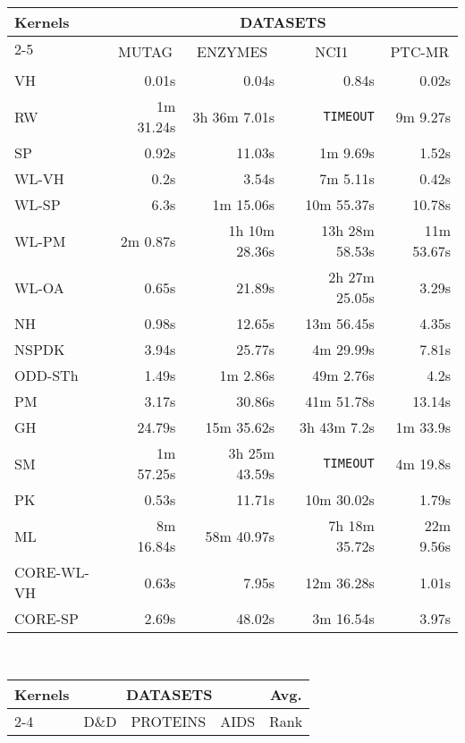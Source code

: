 \documentclass[twoside,11pt]{article}
\begin{document}
\begin{table}[t]
\centering
\scriptsize
\def\arraystretch{1.05}
\begin{tabular}{lrrrr} \toprule
\multirow{3}{*}{Kernels} & \multicolumn{4}{c}{DATASETS} \\ \cline{2-5}
& \multicolumn{1}{c}{\multirow{2}{*}{MUTAG}} & \multicolumn{1}{c}{\multirow{2}{*}{ENZYMES}} & \multicolumn{1}{c}{\multirow{2}{*}{NCI1}} & \multicolumn{1}{c}{\multirow{2}{*}{PTC-MR}} \\
& & & & \\
\midrule
VH & 0.01s & 0.04s & 0.84s & 0.02s \\ 
RW & 1m 31.24s & 3h 36m 7.01s & \texttt{TIMEOUT} & 9m 9.27s \\ 
SP & 0.92s & 11.03s & 1m 9.69s & 1.52s \\ 
WL-VH & 0.2s & 3.54s & 7m 5.11s & 0.42s \\ 
WL-SP & 6.3s & 1m 15.06s & 10m 55.37s & 10.78s \\ 
WL-PM & 2m 0.87s & 1h 10m 28.36s & 13h 28m 58.53s & 11m 53.67s \\ 
WL-OA & 0.65s & 21.89s & 2h 27m 25.05s & 3.29s \\ 
NH & 0.98s & 12.65s & 13m 56.45s & 4.35s \\ 
NSPDK & 3.94s & 25.77s & 4m 29.99s & 7.81s \\ 
ODD-STh & 1.49s & 1m 2.86s & 49m 2.76s & 4.2s \\ 
PM & 3.17s & 30.86s & 41m 51.78s & 13.14s \\ 
GH & 24.79s & 15m 35.62s & 3h 43m 7.2s & 1m 33.9s \\ 
SM & 1m 57.25s & 3h 25m 43.59s & \texttt{TIMEOUT} & 4m 19.8s \\ 
PK & 0.53s & 11.71s & 10m 30.02s & 1.79s \\ 
ML & 8m 16.84s & 58m 40.97s & 7h 18m 35.72s & 22m 9.56s \\ 
CORE-WL-VH & 0.63s & 7.95s & 12m 36.28s & 1.01s \\ 
CORE-SP & 2.69s & 48.02s & 3m 16.54s & 3.97s \\
\bottomrule
\end{tabular}
\vspace{.2cm}
\\
\begin{tabular}{lrrrm{1.48cm}} \toprule
\multirow{3}{*}{Kernels} & \multicolumn{3}{c}{DATASETS} & \multicolumn{1}{c}{\multirow{2}{*}{Avg.}} \\ \cline{2-4}
& \multicolumn{1}{c}{\multirow{2}{*}{D\&D}} & \multicolumn{1}{c}{\multirow{2}{*}{PROTEINS}} & \multicolumn{1}{c}{\multirow{2}{*}{AIDS}} & \multicolumn{1}{c}{\multirow{2}{*}{Rank}} \\ 

\end{tabular}
\end{table}
\end{document}
